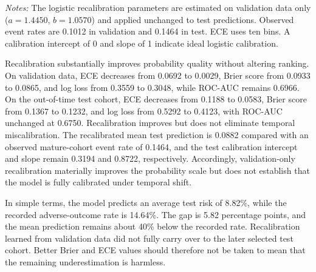 \documentclass[10pt]{article}
\begin{document}
\begin{table}[!ht]
\centering
\caption{Calibration diagnostics before and after validation-only logistic recalibration of the selected HistGB estimator.}
\label{tab:recalibration}

\vspace{3pt}
{\footnotesize \textit{Notes:} The logistic recalibration parameters are estimated on validation data only ($a=1.4450$, $b=1.0570$) and applied unchanged to test predictions. Observed event rates are 0.1012 in validation and 0.1464 in test. ECE uses ten bins. A calibration intercept of 0 and slope of 1 indicate ideal logistic calibration.}
\end{table}

Recalibration substantially improves probability quality without altering ranking. On validation data, ECE decreases from 0.0692 to 0.0029, Brier score from 0.0933 to 0.0865, and log loss from 0.3559 to 0.3048, while ROC-AUC remains 0.6966. On the out-of-time test cohort, ECE decreases from 0.1188 to 0.0583, Brier score from 0.1367 to 0.1232, and log loss from 0.5292 to 0.4123, with ROC-AUC unchanged at 0.6750. Recalibration improves but does not eliminate temporal miscalibration. The recalibrated mean test prediction is 0.0882 compared with an observed mature-cohort event rate of 0.1464, and the test calibration intercept and slope remain 0.3194 and 0.8722, respectively. Accordingly, validation-only recalibration materially improves the probability scale but does not establish that the model is fully calibrated under temporal shift.

In simple terms, the model predicts an average test risk of 8.82\%, while the recorded adverse-outcome rate is 14.64\%. The gap is 5.82 percentage points, and the mean prediction remains about 40\% below the recorded rate. Recalibration learned from validation data did not fully carry over to the later selected test cohort. Better Brier and ECE values should therefore not be taken to mean that the remaining underestimation is harmless.
\end{document}

